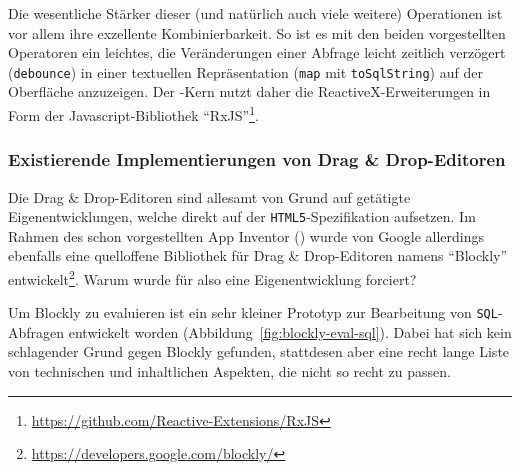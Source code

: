 Die wesentliche Stärker dieser (und natürlich auch viele weitere) Operationen ist vor allem ihre exzellente Kombinierbarkeit. So ist es mit den beiden vorgestellten Operatoren ein leichtes, die Veränderungen einer Abfrage leicht zeitlich verzögert (\texttt{debounce}) in einer textuellen Repräsentation (\texttt{map} mit \texttt{toSqlString}) auf der Oberfläche anzuzeigen. Der \idename{}-Kern nutzt daher die ReactiveX-Erweiterungen in Form der Javascript-Bibliothek "`RxJS"'\footnote{\url{https://github.com/Reactive-Extensions/RxJS}}.

\subsubsection{Existierende Implementierungen von Drag \& Drop-Editoren}

Die Drag \& Drop-Editoren sind allesamt von Grund auf getätigte Eigenentwicklungen, welche direkt auf der \texttt{HTML5}-Spezifikation aufsetzen. Im Rahmen des schon vorgestellten App Inventor () wurde von Google allerdings ebenfalls eine quelloffene Bibliothek für Drag \& Drop-Editoren namens "`Blockly"' entwickelt\footnote{\url{https://developers.google.com/blockly/}}. Warum wurde für \idename{} also eine Eigenentwicklung forciert?

Um Blockly zu evaluieren ist ein sehr kleiner Prototyp zur Bearbeitung von \texttt{SQL}-Abfragen entwickelt worden (Abbildung~\ref{fig:blockly-eval-sql}). Dabei hat sich kein schlagender Grund gegen Blockly gefunden, stattdesen aber eine recht lange Liste von technischen und inhaltlichen Aspekten, die nicht so recht zu \idename{} passen.

